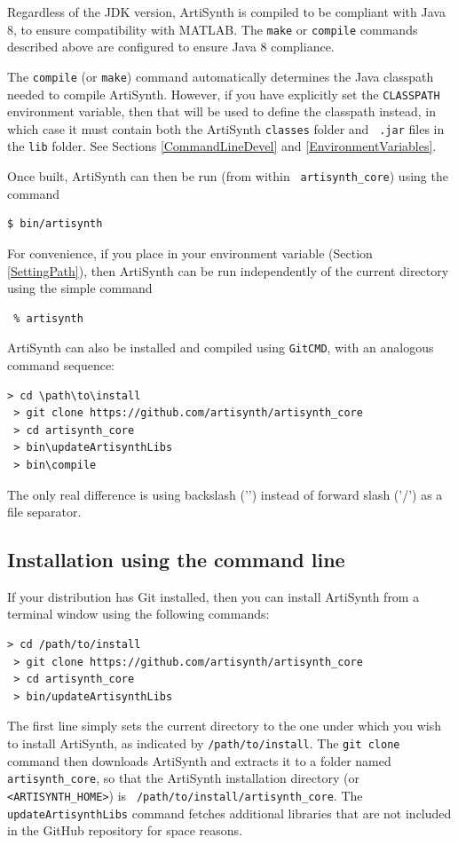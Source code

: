 \begin{sideblock}
Regardless of the JDK version, ArtiSynth is compiled to be compliant with Java
8, to ensure compatibility with MATLAB.  The {\tt make} or {\tt compile}
commands described above are configured to ensure Java 8 compliance.
\end{sideblock}

\begin{sideblock}
The {\tt compile} (or {\tt make}) command automatically determines the Java
classpath needed to compile ArtiSynth.  However, if you have explicitly set the
{\tt CLASSPATH} environment variable, then that will be used to define the
classpath instead, in which case it must contain both the ArtiSynth {\tt classes}
folder and {\tt
.jar} files in the {\tt lib} folder. See Sections \ref{CommandLineDevel}
and \ref{EnvironmentVariables}.
\end{sideblock}

Once built, ArtiSynth can then be run (from within {\tt
artisynth\_core}) using the command
%
\begin{lstlisting}[]
  $ bin/artisynth
\end{lstlisting}
%
\begin{sideblock}
For convenience, if you place  in your \PATH{}
environment variable (Section \ref{SettingPath}), 
then ArtiSynth can be run independently of the current
directory using the simple command
\begin{verbatim}
 % artisynth
\end{verbatim}
\end{sideblock}

ArtiSynth can also be installed and compiled using {\tt GitCMD},
with an analogous command sequence:
%
\begin{lstlisting}[]
 > cd \path\to\install
 > git clone https://github.com/artisynth/artisynth_core
 > cd artisynth_core
 > bin\updateArtisynthLibs
 > bin\compile
\end{lstlisting}
%
The only real difference is using backslash ('\BKS ') instead of
forward slash ('/') as a file separator.
\else %
\subsection{Installation using the command line}

If your \SYSTEM{} distribution has Git installed, then you can
install ArtiSynth from a terminal window using the following
commands:
%
\begin{lstlisting}[]
 > cd /path/to/install
 > git clone https://github.com/artisynth/artisynth_core
 > cd artisynth_core
 > bin/updateArtisynthLibs
\end{lstlisting}
%
The first line simply sets the current directory to the one under which
you wish to install ArtiSynth, as indicated by {\tt /path/to/install}.
The {\tt git clone} command then downloads ArtiSynth and extracts it
to a folder named {\tt artisynth\_core}, so that the ArtiSynth
installation directory (or {\tt <ARTISYNTH\_HOME>}) is {\tt
/path/to/install/artisynth\_core}. The {\tt updateArtisynthLibs}
command fetches additional libraries that are not included in the
GitHub repository for space reasons.
\ifMacOS

